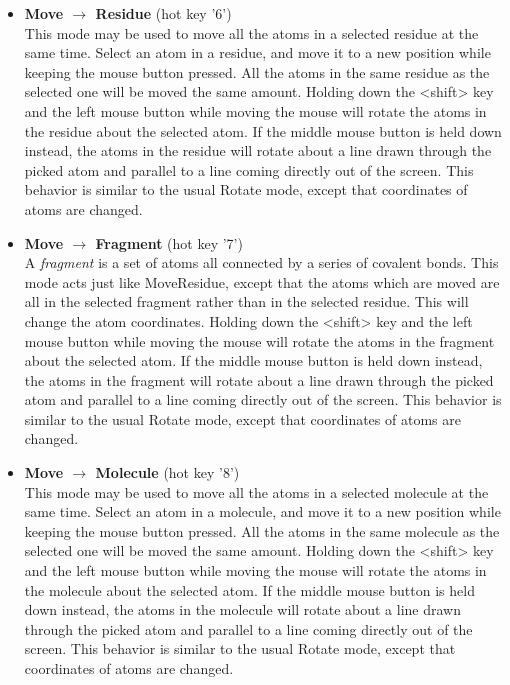 \begin{itemize}
\item {\bf Move $\rightarrow$ Residue} 
\hspace{0.2in} (hot key '6')
\\
This mode may be used to move all the atoms in a selected residue at
the same time.  Select an atom in a residue, and move it to a new
position while keeping the mouse button pressed.  All the atoms in the
same residue as the selected one will be moved the same amount.  
Holding down the <shift> key and the left mouse button while moving the mouse
will rotate the atoms in the residue about the selected atom.  If the middle
mouse button is held down instead, the atoms in the residue will rotate about
a line drawn through the picked atom and parallel to a line coming directly
out of the screen.  This behavior is similar to the usual Rotate mode, except
that coordinates of atoms are changed. 

\item {\bf Move $\rightarrow$ Fragment} 
\hspace{0.2in} (hot key '7')
\\
A {\em fragment} is a set of atoms all connected by a series of
covalent bonds.  This mode acts just like MoveResidue, except that the
atoms which are moved are all in the selected fragment rather than in
the selected residue.  This will change the atom coordinates.
Holding down the <shift> key and the left mouse button while moving the mouse
will rotate the atoms in the fragment about the selected atom.  If the middle
mouse button is held down instead, the atoms in the fragment will rotate about
a line drawn through the picked atom and parallel to a line coming directly
out of the screen.  This behavior is similar to the usual Rotate mode, except
that coordinates of atoms are changed. 

\item {\bf Move $\rightarrow$ Molecule} 
\hspace{0.2in} (hot key '8')
\\
This mode may be used to move all the atoms in a selected molecule at
the same time.  Select an atom in a molecule, and move it to a new
position while keeping the mouse button pressed.  All the atoms in the
same molecule as the selected one will be moved the same amount.  
Holding down the <shift> key and the left mouse button while moving the mouse
will rotate the atoms in the molecule about the selected atom.  If the middle
mouse button is held down instead, the atoms in the molecule will rotate about
a line drawn through the picked atom and parallel to a line coming directly
out of the screen.  This behavior is similar to the usual Rotate mode, except
that coordinates of atoms are changed. 


\end{itemize}
